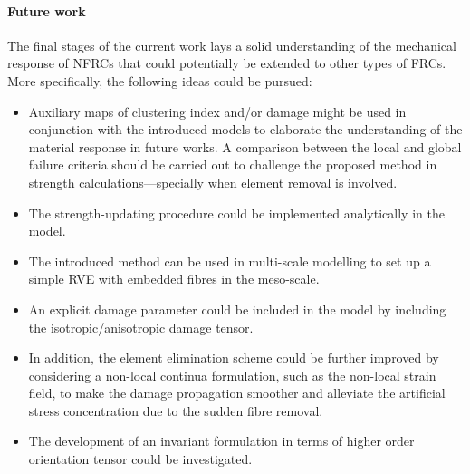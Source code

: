 	\paragraph{Future work} The final stages of the current work lays a solid understanding of the mechanical response of NFRCs that could potentially be extended to other types of FRCs. More specifically, the following ideas could be pursued:
	\begin{itemize}
		\item Auxiliary maps of clustering index and/or damage might be used in conjunction with the introduced models to elaborate the understanding of the material response in future works. A comparison between the local and global failure criteria should be carried out to challenge the proposed method in strength calculations---specially when element removal is involved.
		\item The strength-updating procedure could be implemented analytically in the model.
		\item The introduced method can be used in multi-scale modelling to set up a simple RVE with embedded fibres in the meso-scale. 
		\item An explicit damage parameter could be included in the model by including the isotropic/anisotropic damage tensor.
		\item In addition, the element elimination scheme could be further improved by considering a non-local continua formulation, such as the non-local strain field, to make the damage propagation smoother and alleviate the artificial stress concentration due to the sudden fibre removal.
		\item The development of an invariant formulation in terms of higher order orientation tensor could be investigated.
	\end{itemize}

			
